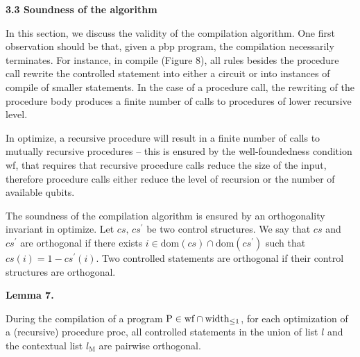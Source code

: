 \documentclass[10pt,a4paper]{amsart}
\begin{document}
 
 
 
\par\medskip\noindent\textbf{3.3 Soundness of the algorithm}\par
 
 
In this section, we discuss the validity of the compilation algorithm. One first observation should be that, given a pbp program, the compilation necessarily terminates. For instance, in compile (Figure 8), all rules besides the procedure call rewrite the controlled statement into either a circuit or into instances of compile of smaller statements. In the case of a procedure call, the rewriting of the procedure body produces a finite number of calls to procedures of lower recursive level.\par
 
 
 
In optimize, a recursive procedure will result in a finite number of calls to mutually recursive procedures – this is ensured by the well-foundedness condition wf, that requires that recursive procedure calls reduce the size of the input, therefore procedure calls either reduce the level of recursion or the number of available qubits.\par
 
 
 
The soundness of the compilation algorithm is ensured by an orthogonality invariant in optimize. Let $cs,\,cs^{\prime}$ be two control structures. We say that $cs$ and $cs^{\prime}$ are orthogonal if there exists $i\in\text{dom}(cs)\cap\text{dom}(cs^{\prime})$ such that $cs(i)=1-cs^{\prime}(i)$. Two controlled statements are orthogonal if their control structures are orthogonal.\par
 
 
 
\par\medskip\noindent\textbf{Lemma 7.}\par
 
 
During the compilation of a program $\mathrm{P}\in\textnormal{{wf}}\cap\textnormal{{width}}_{\leq 1}$, for each optimization of a (recursive) procedure proc, all controlled statements in the union of list $l$ and the contextual list $l_{\text{M}}$ are pairwise orthogonal.\par
 
\end{document}
